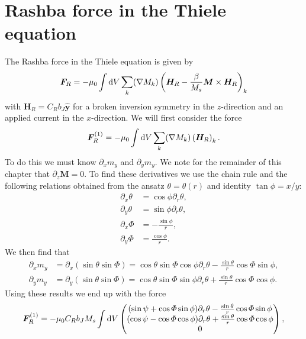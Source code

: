 \chapter{Rashba force in the Thiele equation}\label{app:F_RashbaThiele}
The Rashba force in the Thiele equation is given by
\begin{align}
    \mathbold{F}_R = -\mu_0\int\d V\sum_k(\mathbold{\nabla}M_k)\left(\mathbold{H}_R-\frac{\beta}{M_s}\mathbold{M}\times\mathbold{H}_R\right)_k
\end{align}
with $\mathbold{H}_R = C_R b_J\mathbold{\hat{y}}$ for a broken inversion symmetry in the $z$-direction and an applied current in the $x$-direction. We will first consider the force 
\begin{align}
    \mathbold{F}_R^{(1)} = -\mu_0\int\d V\sum_k(\mathbold{\nabla}M_k)\left(\mathbold{H}_R\right)_k.
\end{align}
To do this we must know $\partial_x m_y$ and $\partial_y m_y$. We note for the remainder of this chapter that $\partial_z \mathbold{M} = 0$. To find these derivatives we use the chain rule and the following relations obtained from the ansatz $\theta = \theta(r)$ and identity $\tan\phi=x/y$:
\begin{subequations}
\begin{align}
    \partial_x\theta &= \cos\phi \partial_r \theta, \\
    \partial_y\theta &= \sin\phi\partial_r\theta, \\
    \partial_x\Phi &= -\frac{\sin\phi}{r}, \\
    \partial_y\Phi &= \frac{\cos\phi}{r}.
\end{align}
\end{subequations}
We then find that
\begin{subequations}
\begin{align}
    \partial_x m_y &= \partial_x(\sin\theta\sin\Phi) = \cos\theta\sin\Phi\cos\phi\partial_r\theta - \frac{\sin\theta}{r}\cos\Phi\sin\phi, \\
    \partial_y m_y &= \partial_y(\sin\theta\sin\Phi) = \cos\theta\sin\Phi\sin\phi\partial_r\theta + \frac{\sin\theta}{r}\cos\Phi\cos\phi.
\end{align}
\end{subequations}
Using these results we end up with the force
\begin{align}
    \mathbold{F}_R^{(1)} = -\mu_0C_Rb_J M_s\int\d V
    \begin{pmatrix}
    (\sin\psi+\cos\Phi\sin\phi)\partial_r\theta-\frac{\sin\theta}{r}\cos\Phi\sin\phi \\
    (\cos\psi-\cos\Phi\cos\phi)\partial_r\theta+\frac{\sin\theta}{r}\cos\Phi\cos\phi \\
    0
    \end{pmatrix},
\end{align}
